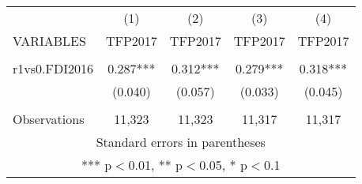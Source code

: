 \documentclass[]{article}
\begin{document}
\begin{tabular}{lcccc} \hline
 & (1) & (2) & (3) & (4) \\
VARIABLES & TFP2017 & TFP2017 & TFP2017 & TFP2017 \\ \hline
 &  &  &  &  \\
r1vs0.FDI2016 & 0.287*** & 0.312*** & 0.279*** & 0.318*** \\
 & (0.040) & (0.057) & (0.033) & (0.045) \\
 &  &  &  &  \\
 Observations & 11,323 & 11,323 & 11,317 & 11,317 \\ \hline
\multicolumn{5}{c}{ Standard errors in parentheses} \\
\multicolumn{5}{c}{ *** p$<$0.01, ** p$<$0.05, * p$<$0.1} \\
\end{tabular}
\end{document}
